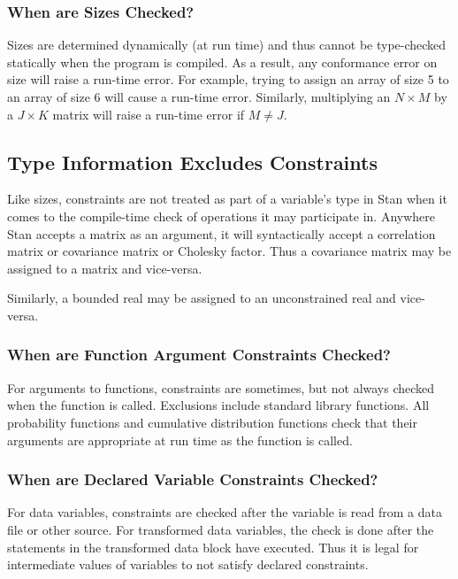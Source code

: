 \subsubsection{When are Sizes Checked?}

Sizes are determined dynamically (at run time) and thus cannot be
type-checked statically when the program is compiled.  As a result,
any conformance error on size will raise a run-time error.  For
example, trying to assign an array of size 5 to an array of size 6
will cause a run-time error.  Similarly, multiplying an $N
\times M$ by a $J \times K$ matrix will raise a run-time error if $M
\neq J$.

\subsection{Type Information Excludes Constraints}

Like sizes, constraints are not treated as part of a variable's type
in Stan when it comes to the compile-time check of operations it may
participate in.  Anywhere Stan accepts a matrix as an argument, it
will syntactically accept a correlation matrix or covariance matrix or
Cholesky factor.  Thus a covariance matrix may be assigned to a matrix
and vice-versa.

Similarly, a bounded real may be assigned to an unconstrained real and
vice-versa.  

\subsubsection{When are Function Argument Constraints Checked?}

For arguments to functions, constraints are sometimes, but not always
checked when the function is called.  Exclusions include \Cpp standard
library functions.  All probability functions and cumulative
distribution functions check that their arguments are appropriate at
run time as the function is called.  

\subsubsection{When are Declared Variable Constraints Checked?}

For data variables, constraints are checked after the variable is read
from a data file or other source.  For transformed data variables, the
check is done after the statements in the transformed data block have
executed.  Thus it is legal for intermediate values of variables to
not satisfy declared constraints.

